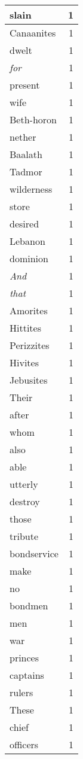 \begin{center}
\begin{longtable}{l|r}
slain & 1 \\ \hline
Canaanites & 1 \\ \hline
dwelt & 1 \\ \hline
\emph{for} & 1 \\ \hline
present & 1 \\ \hline
wife & 1 \\ \hline
Beth-horon & 1 \\ \hline
nether & 1 \\ \hline
Baalath & 1 \\ \hline
Tadmor & 1 \\ \hline
wilderness & 1 \\ \hline
store & 1 \\ \hline
desired & 1 \\ \hline
Lebanon & 1 \\ \hline
dominion & 1 \\ \hline
\emph{And} & 1 \\ \hline
\emph{that} & 1 \\ \hline
Amorites & 1 \\ \hline
Hittites & 1 \\ \hline
Perizzites & 1 \\ \hline
Hivites & 1 \\ \hline
Jebusites & 1 \\ \hline
Their & 1 \\ \hline
after & 1 \\ \hline
whom & 1 \\ \hline
also & 1 \\ \hline
able & 1 \\ \hline
utterly & 1 \\ \hline
destroy & 1 \\ \hline
those & 1 \\ \hline
tribute & 1 \\ \hline
bondservice & 1 \\ \hline
make & 1 \\ \hline
no & 1 \\ \hline
bondmen & 1 \\ \hline
men & 1 \\ \hline
war & 1 \\ \hline
princes & 1 \\ \hline
captains & 1 \\ \hline
rulers & 1 \\ \hline
These & 1 \\ \hline
chief & 1 \\ \hline
officers & 1 \\ \hline

\end{longtable}
\end{center}
